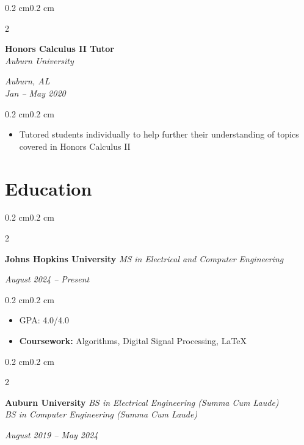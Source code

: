 \documentclass[10pt, letterpaper]{article}
\newenvironment{highlights}{
    \begin{itemize}[topsep=0.10 cm,parsep=0.10 cm,partopsep=0pt,itemsep=0pt,leftmargin=0.4 cm + 10pt]
}{
    \end{itemize}
}
\newenvironment{onecolentry}{
    \begin{adjustwidth}{0.2 cm}{0.2 cm}
}{
    \end{adjustwidth}
}
\newenvironment{twocolentry}[2][]{
    \onecolentry
    \def\secondColumn{#2}
    \setcolumnwidth{\fill, 4.5 cm}
    \begin{paracol}{2}
}{
    \switchcolumn \raggedleft \secondColumn
    \end{paracol}
    \endonecolentry
}
\let\hrefWithoutArrow\href
\renewcommand{\href}[2]{\hrefWithoutArrow{#1}{#2 \raisebox{.15ex}{\footnotesize \faExternalLink*}}}
\begin{document}
        \vspace{0.2 cm}

        \begin{twocolentry}{\textit{Auburn, AL} \\ \textit{Jan – May 2020}}
            \textbf{Honors Calculus II Tutor} \\
            \textit{Auburn University}
        \end{twocolentry}
        \vspace{0.10 cm}
        \begin{onecolentry}
            \begin{highlights}
                \item Tutored students individually to help further their understanding of topics covered in Honors Calculus II
            \end{highlights}
        \end{onecolentry}

        
    \section{Education}
        \begin{twocolentry}{
        \textit{August 2024 – Present}}
            \textbf{Johns Hopkins University}
            \newline
            \textit{MS in Electrical and Computer Engineering}
        \end{twocolentry}
        \vspace{0.10 cm}
        \begin{onecolentry}
            \begin{highlights}
                \item GPA: 4.0/4.0 %
                \item \textbf{Coursework:} Algorithms, Digital Signal Processing, \LaTeX
            \end{highlights}
        \end{onecolentry}
        \vspace{0.2 cm}
        \begin{twocolentry}{
        \textit{August 2019 – May 2024}}
            \textbf{Auburn University}
            \newline
            \textit{BS in Electrical Engineering (Summa Cum Laude)} \\
            \textit{BS in Computer Engineering (Summa Cum Laude)}
        \end{twocolentry}
\end{document}
